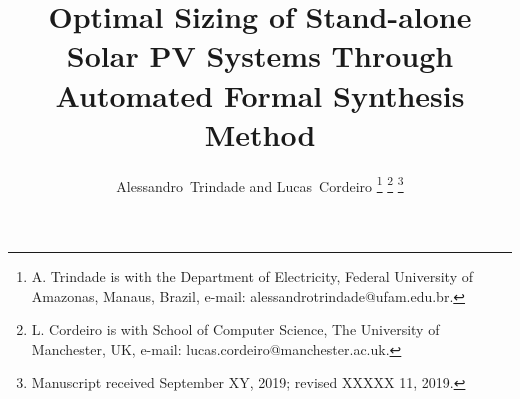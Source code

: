 \documentclass[journal]{IEEEtran}
\begin{document}
%
\title{Optimal Sizing of Stand-alone Solar PV Systems Through Automated Formal Synthesis Method}
%
%
%

\author{Alessandro~Trindade and Lucas~Cordeiro%
\thanks{A. Trindade is with the Department of Electricity, Federal University of Amazonas, Manaus, Brazil, e-mail: alessandrotrindade@ufam.edu.br.}%
\thanks{L. Cordeiro is with School of Computer Science, The University of Manchester, UK, e-mail: lucas.cordeiro@manchester.ac.uk.}%
\thanks{Manuscript received September XY, 2019; revised XXXXX 11, 2019.}}

% 
%
\end{document}
